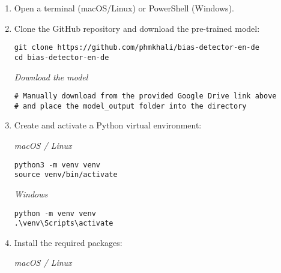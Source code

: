 \begin{enumerate}
    \item Open a terminal (macOS/Linux) or PowerShell (Windows).
    
    \item Clone the GitHub repository and download the pre-trained model:
        
    \begin{tcolorbox}[colback=gray!10, colframe=gray!50, breakable, boxrule=0.4pt, sharp corners]
\begin{verbatim}
git clone https://github.com/phmkhali/bias-detector-en-de
cd bias-detector-en-de
\end{verbatim}
    \end{tcolorbox}
    
    \textit{Download the model}
    
    \begin{tcolorbox}[colback=gray!10, colframe=gray!50, breakable, boxrule=0.4pt, sharp corners]
\begin{verbatim}
# Manually download from the provided Google Drive link above
# and place the model_output folder into the directory
\end{verbatim}
    \end{tcolorbox}
    
    \item Create and activate a Python virtual environment:
    
    \textit{macOS / Linux}
    
    \begin{tcolorbox}[colback=gray!10, colframe=gray!50, breakable, boxrule=0.4pt, sharp corners]
\begin{verbatim}
python3 -m venv venv
source venv/bin/activate
\end{verbatim}
    \end{tcolorbox}
    
    \textit{Windows}
    
    \begin{tcolorbox}[colback=gray!10, colframe=gray!50, breakable, boxrule=0.4pt, sharp corners]
\begin{verbatim}
python -m venv venv
.\venv\Scripts\activate
\end{verbatim}
    \end{tcolorbox}
    
    \item Install the required packages:
    
    \textit{macOS / Linux}
    

\end{enumerate}

